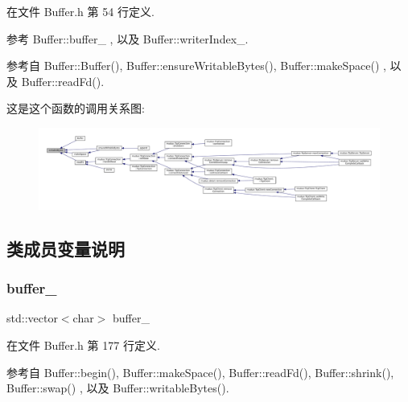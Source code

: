 在文件 Buffer.\+h 第 54 行定义.



参考 Buffer\+::buffer\+\_\+ , 以及 Buffer\+::writer\+Index\+\_\+.



参考自 Buffer\+::\+Buffer(), Buffer\+::ensure\+Writable\+Bytes(), Buffer\+::make\+Space() , 以及 Buffer\+::read\+Fd().

这是这个函数的调用关系图\+:
\nopagebreak
\begin{figure}[H]
\begin{center}
\leavevmode
\includegraphics[width=350pt]{classmuduo_1_1Buffer_a998888da42aba8e7ff1977405f7c33e3_icgraph}
\end{center}
\end{figure}


\subsection{类成员变量说明}
\mbox{\label{classmuduo_1_1Buffer_a906f9199a48e49dfaa86ba3e8edd0269}} 
\subsubsection{\texorpdfstring{buffer\+\_\+}{buffer\_}}
{\footnotesize\ttfamily std\+::vector$<$char$>$ buffer\+\_\+\hspace{0.3cm}{\ttfamily [private]}}



在文件 Buffer.\+h 第 177 行定义.



参考自 Buffer\+::begin(), Buffer\+::make\+Space(), Buffer\+::read\+Fd(), Buffer\+::shrink(), Buffer\+::swap() , 以及 Buffer\+::writable\+Bytes().

\mbox{\label{classmuduo_1_1Buffer_a7c7e801837b45cd542d00cc5ec88dcb1}} 
